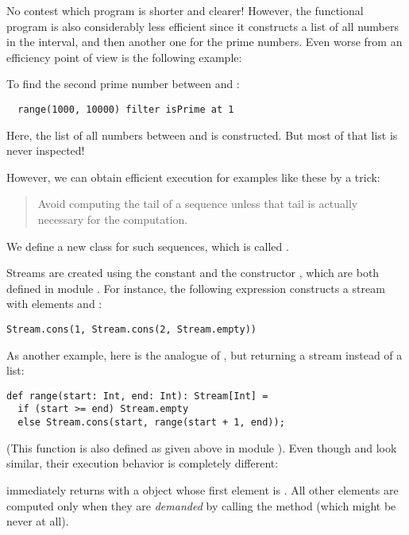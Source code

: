 \documentclass[a4paper,12pt,twoside,titlepage]{book}
\begin{document}
No contest which program is shorter and clearer!  However, the
functional program is also considerably less efficient since it
constructs a list of all numbers in the interval, and then another one
for the prime numbers. Even worse from an efficiency point of view is
the following example:

To find the second prime number between  and :
\begin{lstlisting}
  range(1000, 10000) filter isPrime at 1
\end{lstlisting}
Here, the list of all numbers between  and  is
constructed.  But most of that list is never inspected!

However, we can obtain efficient execution for examples like these by
a trick:
\begin{quote}
 Avoid computing the tail of a sequence unless that tail is actually
     necessary for the computation.
\end{quote}
We define a new class for such sequences, which is called .

Streams are created using the constant  and the constructor ,
which are both defined in module . For instance, the following
expression constructs a stream with elements  and :
\begin{lstlisting}
Stream.cons(1, Stream.cons(2, Stream.empty))
\end{lstlisting}
As another example, here is the analogue of ,
but returning a stream instead of a list:
\begin{lstlisting}
def range(start: Int, end: Int): Stream[Int] = 
  if (start >= end) Stream.empty
  else Stream.cons(start, range(start + 1, end));
\end{lstlisting}
(This function is also defined as given above in module
).  Even though  and 
look similar, their execution behavior is completely different: 

 immediately returns with a  object
whose first element is .  All other elements are computed
only when they are \emph{demanded} by calling the  method
(which might be never at all).  
\end{document}
